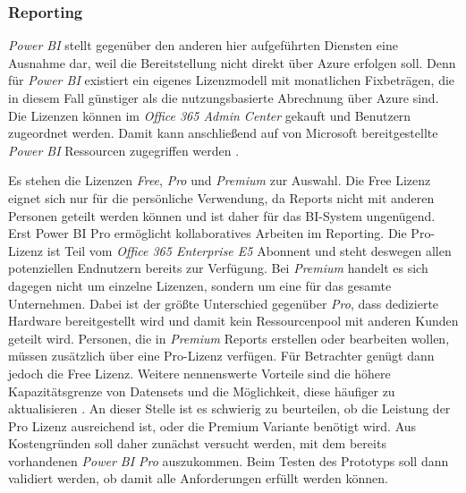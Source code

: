 \subsubsection{Reporting} \label{subsec:infra:konfig:powerbi}
\textit{Power BI} stellt gegenüber den anderen hier aufgeführten Diensten eine Ausnahme dar, weil die Bereitstellung nicht direkt über Azure erfolgen soll. Denn für  \textit{Power BI} existiert ein eigenes Lizenzmodell mit monatlichen Fixbeträgen, die in diesem Fall günstiger als die nutzungsbasierte Abrechnung über Azure sind. Die Lizenzen können im \textit{Office 365 Admin Center} gekauft und Benutzern zugeordnet werden. Damit kann anschließend auf von Microsoft bereitgestellte \textit{Power BI} Ressourcen zugegriffen werden \cite[vgl.][]{gunnarsson_pro_2020}.

Es stehen die Lizenzen \textit{Free}, \textit{Pro} und \textit{Premium} zur Auswahl. Die Free Lizenz eignet sich nur für die persönliche Verwendung, da Reports nicht mit anderen Personen geteilt werden können und ist daher für das BI-System ungenügend. Erst Power BI Pro ermöglicht kollaboratives Arbeiten im Reporting. Die Pro-Lizenz ist Teil vom \textit{Office 365 Enterprise E5} Abonnent und steht deswegen allen potenziellen Endnutzern bereits zur Verfügung. Bei \textit{Premium} handelt es sich dagegen nicht um einzelne Lizenzen, sondern um eine für das gesamte Unternehmen. Dabei ist der größte Unterschied gegenüber \textit{Pro}, dass dedizierte Hardware bereitgestellt wird und damit kein Ressourcenpool mit anderen Kunden geteilt wird. Personen, die in \textit{Premium} Reports erstellen oder bearbeiten wollen, müssen zusätzlich über eine Pro-Lizenz verfügen. Für Betrachter genügt dann jedoch die Free Lizenz. Weitere nennenswerte Vorteile sind die höhere Kapazitätsgrenze von Datensets und die Möglichkeit, diese häufiger zu aktualisieren \cite[vgl.][]{gunnarsson_pro_2020}. An dieser Stelle ist es schwierig zu beurteilen, ob die Leistung der Pro Lizenz ausreichend ist, oder die Premium Variante benötigt wird. Aus Kostengründen soll daher zunächst versucht werden, mit dem bereits vorhandenen \textit{Power BI Pro} auszukommen. Beim Testen des Prototyps soll dann validiert werden, ob damit alle Anforderungen erfüllt werden können.

